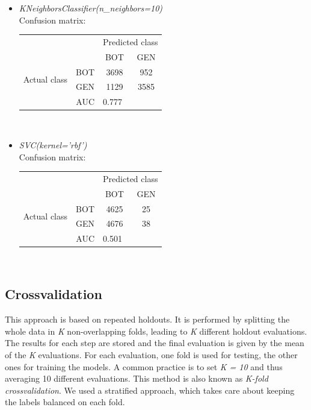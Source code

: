\begin{itemize}
	
	\item[\PencilRight] \textit{KNeighborsClassifier(n\_neighbors=10)}\\
	Confusion matrix:
	
	{
		\centering
		\begin{tabular}{@{}cc|cc@{}}
			\multicolumn{1}{c}{} &\multicolumn{1}{c}{} &\multicolumn{2}{c}{Predicted class} \\ 
			\multicolumn{1}{c}{} & 
			\multicolumn{1}{c|}{} & 
			\multicolumn{1}{c}{BOT} & 
			\multicolumn{1}{c}{GEN}  \\
			\cline{2-4}
			\multirow[c]{2}{*}{Actual class}
			& BOT  & 3698 &  952\\
			& GEN  & 1129 & 3585\\
			\cline{2-4}
			\multicolumn{2}{r|}{AUC} & 
			\multicolumn{2}{l}{0.777}\\
		\end{tabular}\\
	}

	
	\item[\PencilRight] \textit{SVC(kernel='rbf')}\\
	Confusion matrix:
	
	{
		\centering
		\begin{tabular}{@{}cc|cc@{}}
			\multicolumn{1}{c}{} &\multicolumn{1}{c}{} &\multicolumn{2}{c}{Predicted class} \\ 
			\multicolumn{1}{c}{} & 
			\multicolumn{1}{c|}{} & 
			\multicolumn{1}{c}{BOT} & 
			\multicolumn{1}{c}{GEN}  \\
			\cline{2-4}
			\multirow[c]{2}{*}{Actual class}
			& BOT  & 4625 & 25\\
			& GEN  & 4676 & 38\\
			\cline{2-4}
			\multicolumn{2}{r|}{AUC} & 
			\multicolumn{2}{l}{0.501}\\
		\end{tabular}\\
	}

\end{itemize}

\subsection{Crossvalidation}
This approach is based on repeated holdouts. It is performed by splitting the whole data in \textit{K} non-overlapping folds, leading to \textit{K} different holdout evaluations. The results for each step are stored and the final evaluation is given by the mean of the \textit{K} evaluations. For each evaluation, one fold is used for testing, the other ones for training the models. A common practice is to set \textit{K = 10} and thus averaging 10 different evaluations.
This method is also known as \textit{K-fold crossvalidation}. We used a stratified approach, which takes care about keeping the labels balanced on each fold.

